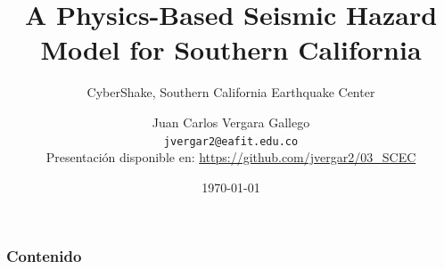 \documentclass{beamer}
\begin{document}
\title[CyberShake] %
{A Physics-Based Seismic Hazard Model for Southern California}
\subtitle{CyberShake, Southern California Earthquake Center}
\author[Vergara Gallego, Juan Carlos] %
{Juan Carlos Vergara Gallego\\ \texttt{\small jvergar2@eafit.edu.co}\\
{\tiny Presentación disponible en: \url{https://github.com/jvergar2/03_SCEC}}}
\date{\today}
\subject{Ingeniería Sísmica}

\frame{\titlepage}

\begin{frame}[allowframebreaks]
	\frametitle{Contenido}
	\tableofcontents
\end{frame}
%
%
\end{document}
